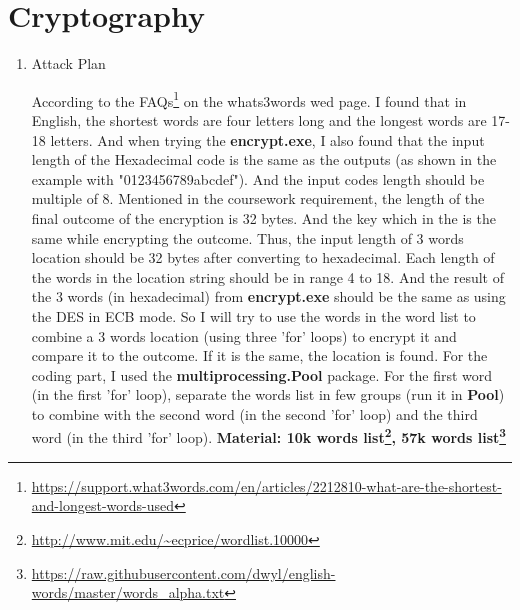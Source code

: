 \documentclass[margin 2cm]{report}
\begin{document}
\newpage
\Large\section[2]{Cryptography}

\begin{enumerate}
\normalsize\item[1)]{Attack Plan}
\begin{spacing}{1.5}
\newline\normalsize\indent\setlength{\parindent}{2em}According to the FAQs\footnote[2]{\url{https://support.what3words.com/en/articles/2212810-what-are-the-shortest-and-longest-words-used}} on the whats3words wed page. I found that in English, the shortest words are four letters long and the longest words are 17-18 letters. And when trying the \textbf{encrypt.exe}, I also found that the input length of the Hexadecimal code is the same as the outputs (as shown in the example with "0123456789abcdef"). And the input codes length should be multiple of 8. \newline Mentioned in the coursework requirement, the length of the final outcome of the encryption is 32 bytes. And the key which in the  is the same while encrypting the outcome. \newline Thus, the input length of 3 words location should be 32 bytes after converting to hexadecimal. Each length of the words in the location string should be in range 4 to 18. And the result of the 3 words (in hexadecimal) from \textbf{encrypt.exe} should be the same as using the DES in ECB mode. So I will try to use the words in the word list to combine a 3 words location (using three 'for' loops) to encrypt it and compare it to the outcome. If it is the same, the location is found. For the coding part, I used the \textbf{multiprocessing.Pool} package. For the first word (in the first 'for' loop), separate the words list in few groups (run it in \textbf{Pool}) to combine with the second word (in the second 'for' loop)  and the third word (in the third 'for' loop). \newline\textbf{Material: 10k words list\footnote[3]{\url{http://www.mit.edu/~ecprice/wordlist.10000}}, 57k words list\footnote[4]{\url{https://raw.githubusercontent.com/dwyl/english-words/master/words_alpha.txt}}}
\end{spacing}



\end{enumerate}
\end{document}
